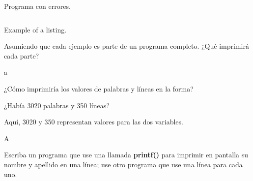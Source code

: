 \documentclass[spanish,addpoints,answers,a4paper]{exam}
\begin{document}
\begin{questions}
\begin{listing}[H]
\footnotesize
\inputminted{c}{exercise3.c}
\caption{Programa con errores.}
\label{lst:3}
\end{listing}

\begin{solution}
\begin{listing}[H]
\footnotesize
\inputminted{c}{exercise3a.c}
\caption{Example of a listing.}
\label{lst:3a}
\end{listing}
\end{solution}

\question Asumiendo que cada ejemplo es parte de un programa completo. ¿Qué imprimirá cada parte?


\begin{solution}
a
\end{solution}

\question ¿Cómo imprimiría los valores de palabras y líneas en la forma?

¿Había 3020 palabras y 350 líneas?

Aquí, 3020 y 350 representan valores para las dos variables.

\begin{solution}
	A
\end{solution}

\question Escriba un programa que use una llamada \textbf{printf()} para imprimir en pantalla su nombre y apellido en una línea; use otro programa que use una línea para cada uno.


\end{questions}
\end{document}
